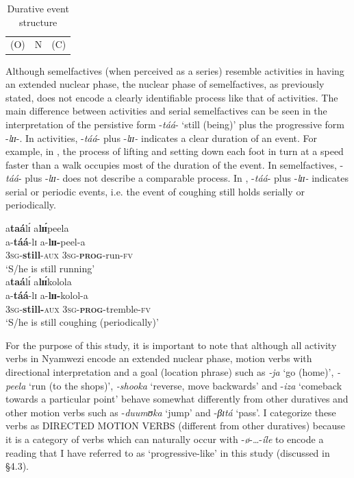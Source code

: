 \documentclass[output=paper]{langscibook}
\begin{document}
\begin{table}
\caption{Durative event structure}
\label{fig:kanijo:6}
\begin{tabularx}{.5\textwidth}{c|c|c}
\cline{1-3}
(O) & N & (C)\\
\cline{1-3}
\end{tabularx}
\end{table} 

  Although semelfactives (when perceived as a series) resemble activities in having an extended nuclear phase, the nuclear phase of semelfactives, as previously stated, does not encode a clearly identifiable process like that of activities. The main difference between activities and serial semelfactives can be seen in the interpretation of the persistive form -\textit{táá}- ‘still (being)’ plus the progressive form -\textit{lɪɪ}-. In activities, -\textit{táá}- plus -\textit{lɪɪ-} indicates a clear duration of an event. For example, in , the process of lifting and setting down each foot in turn at a speed faster than a walk occupies most of the duration of the event. In semelfactives, -\textit{táá}- plus -\textit{lɪɪ-} does not describe a comparable process. In , -\textit{táá}- plus -\textit{lɪɪ-} indicates serial or periodic events, i.e. the event of coughing still holds serially or periodically.

\ea
\ea \label{ex:kanijo:14a}
\glll a\textbf{taá}lɪ́ a\textbf{lɪɪ́}peela\\ 
a-\textbf{táá}-lɪ  a-\textbf{lɪɪ}\textbf{-}peel-a\\
3\textsc{sg}-\textbf{still}-\textsc{aux} 3\textsc{sg}-\textbf{\textsc{prog}}-run-\textsc{fv}\\ 
\glt ‘S/he is still running’\\
\ex \label{ex:kanijo:14b}
\glll a\textbf{taá}lɪ́      a\textbf{l}\textbf{ɪɪ́}kolola\\
a-\textbf{táá}-lɪ            a-\textbf{lɪɪ-}kolol-a\\  
3\textsc{sg}-\textbf{still-}\textsc{aux} 3\textsc{sg}-\textbf{\textsc{prog}}-tremble-\textsc{fv}\\
\glt ‘S/he is still coughing (periodically)’\\  
\z
\z

For the purpose of this study, it is important to note that although all activity verbs in Nyamwezi encode an extended nuclear phase, motion verbs with directional interpretation and a goal (location phrase) such as \textit{-ja} ‘go (home)’, \textit{-peela} ‘run (to the shops)’, \textit{-shooka} ‘reverse, move backwards’ and -\textit{iza} ‘comeback towards a particular point’ behave somewhat differently from other duratives and other motion verbs such as -\textit{duumʊ}\textit{ka} ‘jump’ and -\textit{βɪ}\textit{tá} ‘pass’. I categorize these verbs as DIRECTED MOTION VERBS (different from other duratives) because it is a category of verbs which can naturally occur with -\textit{ø}-…-\textit{íle} to encode a reading that I have referred to as ‘progressive-like’ in this study (discussed in §4.3).
\end{document}
